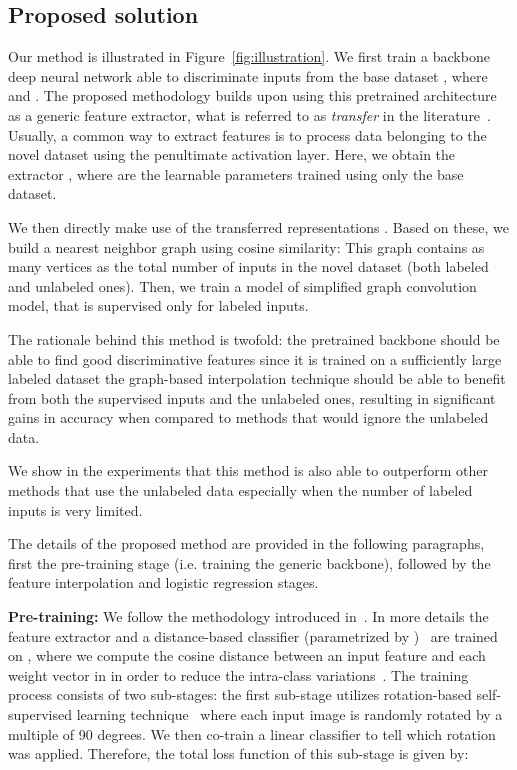 \documentclass[a4paper,conference]{IEEEtran}
\begin{document}
\subsection{Proposed solution}

Our method is illustrated in Figure~\ref{fig:illustration}.
We first train a backbone deep neural network able to discriminate inputs from the base dataset , where  and . The proposed methodology builds upon using this pretrained architecture as a generic feature extractor, what is referred to as \emph{transfer} in the literature~\cite{torrey2010transfer}. Usually, a common way to extract features is to process data belonging to the novel dataset using the penultimate activation layer. Here, we obtain the extractor , where  are the learnable parameters trained using only the base dataset.

We then directly make use of the transferred representations . Based on these, we build a  nearest neighbor graph using cosine similarity: 
This graph contains as many vertices as the total number of inputs in the novel dataset (both labeled and unlabeled ones).
Then, we train a model of simplified graph convolution model, that is supervised only for labeled inputs.

The rationale behind this method is twofold:  the pretrained backbone should be able to find good discriminative features since it is trained on a sufficiently large labeled dataset  the graph-based interpolation technique should be able to benefit from both the supervised inputs and the unlabeled ones, resulting in significant gains in accuracy when compared to methods that would ignore the unlabeled data. 

We show in the experiments that this method is also able to outperform other methods that use the unlabeled data especially when the number of labeled inputs is very limited.

The details of the proposed method are provided in the following paragraphs, first the pre-training stage (i.e. training the generic backbone), followed by the feature interpolation and logistic regression stages.

\textbf{Pre-training:} We follow the methodology introduced in~\cite{mangla2020charting}. In more details the feature extractor  and a distance-based classifier (parametrized by )~\cite{mensink2012metric} are trained on , where we compute the cosine distance between an input feature  and each weight vector in  in order to reduce the intra-class variations~\cite{chen2019closer}. The training process consists of two sub-stages: the first sub-stage utilizes rotation-based self-supervised learning technique~\cite{gidaris2018unsupervised} where each input image is randomly rotated by a multiple of 90 degrees. We then co-train a linear classifier to tell which rotation was applied. Therefore, the total loss function of this sub-stage is given by:
\end{document}
